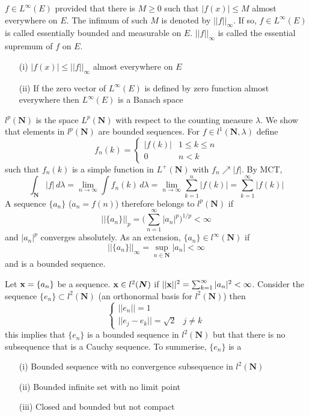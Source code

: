 \vspace{2ex}
\begin{defi}
$f\in L^{\infty }(E)$ provided that there is $M\geq 0$ such that $|f(x)|\leq M$ almost everywhere on $E$. The infimum of such $M$ is denoted by $||f||_{\infty }$. If so, $f\in L^{\infty }(E)$ is called essentially bounded and measurable on $E$. $||f||_{\infty }$ is called the essential supremum of $f$ on $E$. \end{defi}
\vspace{2ex}
\begin{rmk}
\begin{itemize}
\item[(i)] $|f(x)|\leq ||f||_{\infty }$ almost everywhere on $E$
\item[(ii)] If the zero vector of $L^{\infty }(E)$ is defined by zero function almost everywhere then $L^{\infty }(E)$ is a Banach space
\end{itemize}
\end{rmk}
\vspace{2ex}
\begin{defi}
$l^{p}({\bm N})$ is the space $L^{p}({\bm N})$ with respect to the counting measure $\lambda $. We show that elements in $l^{p}({\bm N})$  are bounded sequences. For $f\in l^{1}({\bm N},\lambda )$ define 
\[f_{n}(k)=\begin{cases}
|f(k)|&1\leq k\leq n\\
0&n<k
\end{cases}\]
such that $f_{n}(k)$ is a simple function in $L^{+}({\bm N})$ with $f_{n}\nearrow |f|$. By MCT, 
\[\int _{{\bm N}}|f|\,d \lambda =\lim _{n\rightarrow \infty }\int f_{n}(k)\,d \lambda =\lim _{n\rightarrow \infty }\sum ^{n }_{k=1}|f(k)|=\sum ^{\infty }_{k=1}|f(k)|\]
A sequence $\{a_{n}\}$ ($a_{n}=f(n)$) therefore belongs to $l^{p}({\bm N})$ if 
\[
||\{a_{n}\}||_{p}=\Big(\sum _{n=1}^{\infty }|a_{n}|^{p}\Big)^{1/p}<\infty \]
and $|a_{n}|^{p}$ converges absolutely. As an extension, $\{a_{n}\}\in l^{\infty }({\bm N})$ if 
\[||\{a_{n}\}||_{\infty }=\sup_{n\in {\bm N}}|a_{n}|<\infty \]
and is a bounded sequence.
\end{defi}
\vspace{2ex}
\begin{defi}
Let ${\bf x}=\{a_{n}\}$ be a sequence. ${\bf x}\in l^{2}({\bm N})$ if $||{\bf x}||^2=\sum ^{\infty }_{k=1}|a_{n}|^{2}<\infty $. Consider the sequence $\{e_{n}\}\subset l^2({\bm N})$ (an orthonormal basis for $l^2({\bm N})$) then
\[\begin{cases}
||e_{n}||=1\\
||e_{j}-e_{k}||=\sqrt{2}&j\ne k
\end{cases}\]
this implies that $\{e_{n}\}$ is a bounded sequence in $l^2({\bm N})$ but that there is no subsequence that is a Cauchy sequence. To summerise, $\{e_{n}\}$ is a 
\begin{itemize}
\item[(i)] Bounded sequence with no convergence subsequence in $l^2({\bm N})$
\item[(ii)] Bounded infinite set with no limit point
\item[(iii)] Closed and bounded but not compact 
\end{itemize}
\end{defi}
